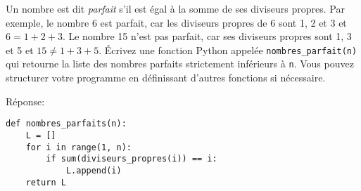 \begin{question}[7 pts]
Un nombre est dit \emph{parfait} s'il est égal à la somme de ses diviseurs
propres. Par exemple, le nombre 6 est parfait, car les diviseurs propres de 6
sont 1, 2 et 3 et $6=1+2+3$. Le nombre 15 n'est pas parfait, car ses diviseurs
propres sont 1, 3 et 5 et $15\neq 1+3+5$. Écrivez une fonction Python appelée
\verb|nombres_parfait(n)| qui retourne la liste des nombres parfaits
strictement inférieurs à \verb|n|. Vous pouvez structurer votre programme en
définissant d'autres fonctions si nécessaire.
\begin{mybox}
    Réponse:
\begin{reponse}
\begin{verbatim}
def nombres_parfaits(n):
    L = []
    for i in range(1, n):
        if sum(diviseurs_propres(i)) == i:
            L.append(i)
    return L
\end{verbatim}
\end{reponse}
\vspace{10cm}
\phantom{x}
\end{mybox}
\end{question}


